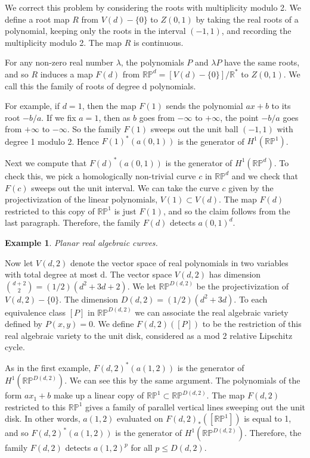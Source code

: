 \documentclass{amsart}
\newtheorem*{Theorem 1}{Theorem 1}
\newtheorem*{Theorem 2}{Theorem 2}
\newtheorem*{Theorem 1A}{Theorem 1A}
\newtheorem*{Theorem 2A}{Theorem 2A}
\newtheorem{example}{Example}
\newtheorem*{vanishing lemma}{Vanishing Lemma}
\numberwithin{equation}{section}
\begin{document}
We correct this problem by considering the roots with
multiplicity modulo 2.  We define a root map $R$ from $V(d) - \{
0 \}$ to $Z(0,1)$ by taking the real roots of a polynomial,
keeping only the roots in the interval $(-1, 1)$, and recording
the multiplicity modulo 2.  The map $R$ is continuous.

For any non-zero real number $\lambda$, the polynomials $P$ and
$\lambda P$ have the same roots, and so $R$ induces a map $F(d)$
from $\mathbb{RP}^d = [V(d) - \{ 0 \} ] / \mathbb{R}^*$ to
$Z(0,1)$.  We call this the family of roots of degree d
polynomials.

For example, if $d = 1$, then the map $F(1)$ sends the
polynomial $a x + b$ to its root $-b/a$.  If we fix
$a=1$, then as $b$ goes from $- \infty$ to $+ \infty$,
the point $-b/a$ goes from $+ \infty$ to $- \infty$.  So
the family $F(1)$ sweeps out the unit ball $(-1, 1)$ with
degree 1 modulo 2.  Hence $F(1)^* (a(0,1))$ is the generator
of $H^1(\mathbb{RP}^1)$.

Next we compute that $F(d)^*(a(0,1))$ is the generator of
$H^1(\mathbb{RP}^d)$.  To check this, we pick a homologically
non-trivial curve $c$ in $\mathbb{RP}^d$ and we check that 
$F(c)$ sweeps out the unit interval.  We can take
the curve $c$ given by the projectivization of the linear
polynomials, $V(1) \subset V(d)$.  The map $F(d)$ restricted to this
copy of $\mathbb{RP}^1$ is just $F(1)$, and so the claim
follows from the last paragraph.  Therefore, the family $F(d)$ 
detects $a(0,1)^d$.

\begin{example} Planar real algebraic curves.
\end{example}

Now let $V(d,2)$ denote the vector space of real polynomials in
two variables with total degree at most d.  The vector space
$V(d,2)$ has dimension ${d+2 \choose 2} = (1/2) (d^2 + 3d + 2)$.
We let $\mathbb{RP}^{D(d,2)}$ be the projectivization of $V(d,2)
- \{ 0 \}$.  The dimension $D(d,2) = (1/2) (d^2 + 3d)$.  To each
equivalence class $[P]$ in $\mathbb{RP}^{D(d,2)}$ we can
associate the real algebraic variety defined by $P(x,y) = 0$.  We
define $F(d,2) ([P])$ to be the restriction of this real
algebraic variety to the unit disk, considered as a mod 2
relative Lipschitz cycle.

As in the first example, $F(d,2)^*(a(1,2))$ is the generator of
$H^1(\mathbb{RP}^{D(d,2)})$.  We can see this by the same
argument.  The polynomials of the form $a x_1 + b$ make up a
linear copy of $\mathbb{RP}^1 \subset \mathbb{RP}^{D(d,2)}$.  The
map $F(d,2)$ restricted to this $\mathbb{RP}^1$ gives a family of
parallel vertical lines sweeping out the unit disk.  In other words,
$a(1,2)$ evaluated on $F(d,2)_*([\mathbb{RP}^1])$ is equal to 1, and
so $F(d,2)^*(a(1,2))$ is the generator of
$H^1(\mathbb{RP}^{D(d,2)})$.  Therefore, the family $F(d,2)$
detects $a(1,2)^p$ for all $p \le D(d,2)$.
\end{document}
